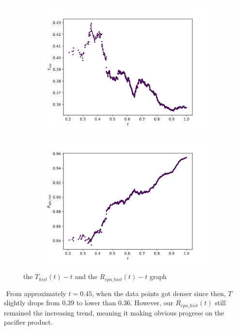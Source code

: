 \documentclass[12pt]{article}  %
\begin{document}
\begin{figure}[H]
  \centering
  \begin{subfigure}{.5\textwidth}
    \centering
    \includegraphics[width=\linewidth]{Q2picture/T_hist-t.png}
    \label{fig:}
  \end{subfigure}%
  \begin{subfigure}{.5\textwidth}
    \centering
    \includegraphics[width=\linewidth]{Q2picture/Repu_hist-t.png}
    \label{fig:}
  \end{subfigure}
  \caption{the $T_{hist}(t)-t$ and the $R_{epu\_hist}(t)-t$ graph}
  \label{fig:}
\end{figure}


​		From approximately $t = 0.45$, when the data points got denser since then, $T$ slightly drops from 0.39 to lower than 0.36. However, our $R_{epu\_hist}(t)$ still remained the increasing trend, meaning it making obvious progress on the pacifier product.
\end{document}

